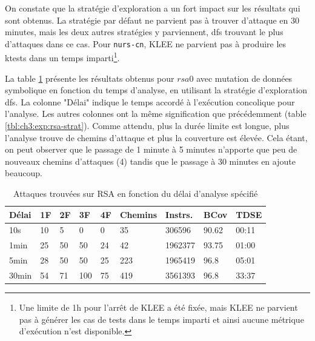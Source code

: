             On constate que la stratégie d'exploration a un fort impact sur les résultats qui sont obtenus. La stratégie par défaut ne parvient pas à trouver d'attaque en 30 minutes, mais les deux autres stratégies y parviennent, \gls{dfs} trouvant le plus d'attaques dans ce cas. 
            Pour \texttt{nurs-cn}, KLEE ne parvient pas à produire les ktests dans un temps imparti\footnote{Une limite de 1h pour l'arrêt de KLEE a été fixée, mais KLEE ne parvient pas à générer les cas de tests dans le temps imparti et ainsi aucune métrique d'exécution n'est disponible.}.
        
            La table \ref{tbl:ch3:exp:rsa-time} présente les résultats obtenus pour $rsa0$ avec mutation de données symbolique en fonction du temps d'analyse, en utilisant la stratégie d'exploration \gls{dfs}. 
            La colonne "Délai" indique le temps accordé à l'exécution concolique pour l'analyse.
            Les autres colonnes ont la même signification que précédemment (table \ref{tbl:ch3:exp:rsa-strat}). 
            Comme attendu, plus la durée limite est longue, plus l'analyse trouve de chemins d'attaque et plus la couverture est élevée.
            Cela étant, on peut observer que le passage de 1 minute à 5 minutes n'apporte que peu de nouveaux chemins d'attaques (4) tandis que le passage à 30 minutes en ajoute beaucoup.
    
            \begin{table}[ht]
                \small
                    \caption{Attaques trouvées sur RSA en fonction du délai d'analyse spécifié}\label{tbl:ch3:exp:rsa-time}
                \begin{center}
                \setlength\tabcolsep{4pt} 
                    \begin{tabular}{l|llll|lll|l}
                    Délai & 1F & 2F & 3F & 4F & Chemins & Instrs. & BCov & TDSE \\
                    \hline
                    10s & 10 & 5 & 0 & 0 & 35 & 306596 & 90.62 & 00:11 \\
                    1min & 25 & 50 & 50 & 24 & 42 & 1962377 & 93.75 & 01:00 \\
                    5min & 28 & 50 & 50 & 25 & 223 & 1965419 & 96.8 & 05:01 \\
                    30min & 54 & 71 & 100 & 75 & 419 & 3561393 & 96.8 & 33:37
                    \end{tabular}
                \end{center}
            \end{table} 
            
